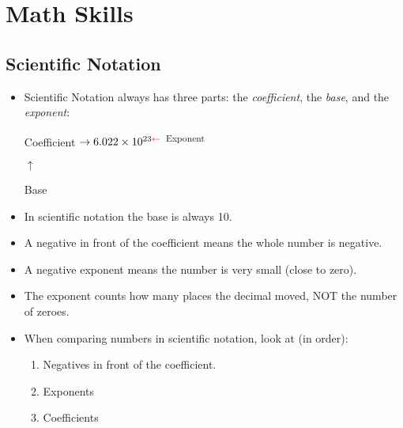 



\chapter{Math Skills}

\section{Scientific Notation}


	\begin{itemize}
		\item Scientific Notation always has three parts: the \textit{coefficient}, the \textit{base}, and the \textit{exponent}:
		\begin{center}
			\color{blue} Coefficient $\rightarrow \color{black} 6.022 \times 10^{23 \color{red}\leftarrow}$ \textsuperscript{\color{red}Exponent} \color{black}
			
			\hspace{.7in} \color{orange}$\uparrow$
			
			\hspace{.7in} Base \color{black}
		\end{center}
		\item In scientific notation the \color{orange} base \color{black}is always 10. 
		\item A negative in front of the  \color{blue} coefficient \color{black} means the whole number is negative. 
		\item  A negative \color{red} exponent \color{black} means the number is very small (close to zero). \color{black}
		\item  The \color{red} exponent \color{black} counts how many places the decimal moved, NOT the number of zeroes.	
		\item When comparing numbers in scientific notation, look at (in order): 
		\begin{enumerate}
			\item  Negatives in front of the \color{blue} coefficient. \color{black}
			\item \color{red}Exponents \color{black}
			\item \color{blue}Coefficients \color{black}
		\end{enumerate}
		

\end{itemize}
